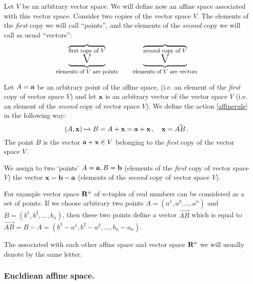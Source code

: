 \documentclass[12pt]{article}
\numberwithin{equation}{section}
\begin{document}
    Let $V$ be an arbitrary vector space.
  We will define now an affine space associated with this vector space.
  Consider two copies of the vector space $V$. The elements of
the {\it first} copy we will call ``points'', 
and the elements
of the {\it second} copy we will call as usual ``vectors'':
           \begin{equation}\label{affineandvector}
               \underbrace
            {
    \overbrace {\hbox {\footnotesize first copy of $V$}}_
       {\hbox {\LARGE V}}
            }_
{\hbox {\footnotesize elements of $V$ are points}}
      \qquad
            \underbrace
            {
    \overbrace {\hbox {\footnotesize second copy of $V$}}_
       {\hbox {\LARGE V}}
            }_
{\hbox {\footnotesize elements of $V$ are vectors}}
            \end{equation}
   
  Let  $A={\bf a}$ be an arbitrary point of the affine space,
 (i.e. an element of the {\it first} copy of vector space $V$)
 and let ${\bf x}$ is an arbitrary vector of the vector space $V$
 (i.e. an element of the {\it second}  copy of vector space $V$).
  We define the action \eqref{affinerule} in the following way:
            $$
(A,{\bf x})\mapsto B=A+{\bf x}={\bf a}+{\bf x}\,,\quad {\bf x}=\vec{AB}\,.
            $$ 
The  point $B$ is the vector ${\bf a}+{\bf x}\in V$ belonging to
 the {\it first} copy of the vector
space $V$.

 We assign to two `points' $A={\bf a},B={\bf b}$ 
(elements of the {\it first} copy of vector space $V$) 
the vector ${\bf x}={\bf b}-{\bf a}$ (elements of the {\it second} 
copy of vector space $V$).


\smallskip
   
  For example vector space ${\bf R}^n$ of $n$-tuples  of real numbers 
can be considered as a set of points. If we choose 
arbitrary two points 
$A=(a^1,a^2.\dots,a^n)$ and $B=(b^1,b^2,\dots,b_n)$, 
then these two points define a vector $\vec{AB}$
which is equal to 
$\vec{AB}=B-A=(b^1-a^1,b^2-a^2,\dots,b_n-a_n)$.

   The associated with each other affine space and
vector space ${\bf R}^n$ we will usually denote by the same letter. 

\subsubsection {Eucldiean affine space.}
\end{document}
